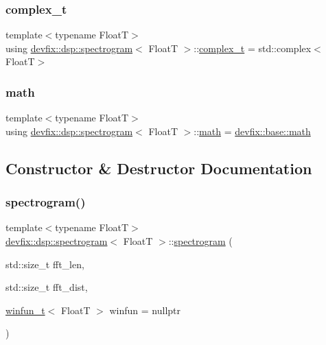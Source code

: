 \subsubsection{\texorpdfstring{complex\+\_\+t}{complex\_t}}
{\footnotesize\ttfamily template$<$typename FloatT$>$ \\
using \hyperlink{structdevfix_1_1dsp_1_1spectrogram}{devfix\+::dsp\+::spectrogram}$<$ FloatT $>$\+::\hyperlink{structdevfix_1_1dsp_1_1spectrogram_a222d1efa23713b334a001e625594b4d4}{complex\+\_\+t} =  std\+::complex$<$FloatT$>$}

\mbox{\label{structdevfix_1_1dsp_1_1spectrogram_a53742b1396ec0554de79059ab4b173ff}} 
\subsubsection{\texorpdfstring{math}{math}}
{\footnotesize\ttfamily template$<$typename FloatT$>$ \\
using \hyperlink{structdevfix_1_1dsp_1_1spectrogram}{devfix\+::dsp\+::spectrogram}$<$ FloatT $>$\+::\hyperlink{structdevfix_1_1dsp_1_1spectrogram_a53742b1396ec0554de79059ab4b173ff}{math} =  \hyperlink{structdevfix_1_1base_1_1math}{devfix\+::base\+::math}}



\subsection{Constructor \& Destructor Documentation}
\mbox{\label{structdevfix_1_1dsp_1_1spectrogram_a9edbcaca234c9552386ca57cd2d4681c}} 
\subsubsection{\texorpdfstring{spectrogram()}{spectrogram()}}
{\footnotesize\ttfamily template$<$typename FloatT$>$ \\
\hyperlink{structdevfix_1_1dsp_1_1spectrogram}{devfix\+::dsp\+::spectrogram}$<$ FloatT $>$\+::\hyperlink{structdevfix_1_1dsp_1_1spectrogram}{spectrogram} (\begin{DoxyParamCaption}\item[{std\+::size\+\_\+t}]{fft\+\_\+len,  }\item[{std\+::size\+\_\+t}]{fft\+\_\+dist,  }\item[{\hyperlink{namespacedevfix_1_1dsp_a6667d1bec03c0d82f87521b87d3fcf24}{winfun\+\_\+t}$<$ FloatT $>$}]{winfun = {\ttfamily nullptr} }\end{DoxyParamCaption})\hspace{0.3cm}{\ttfamily [inline]}}



